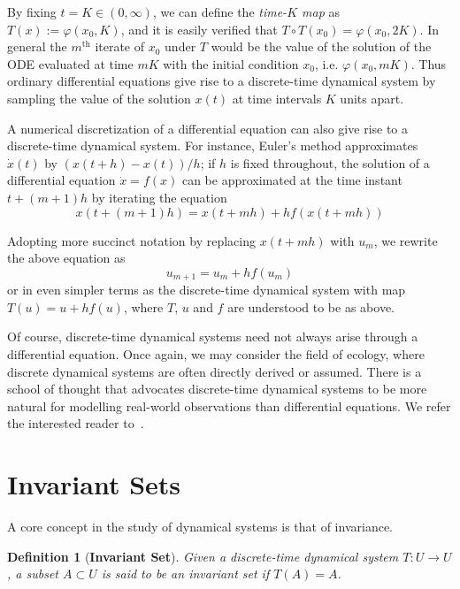 \documentclass[a4paper,12pt,twoside]{report}
\newtheorem{Definition}{Definition}[]
\begin{document}
By fixing $t=K \in (0,\infty)$, we can define the \emph{time-$K$ map} as  $T(x):= \varphi(x_0,K)$, and it is easily verified that $T\circ T(x_0) = \varphi(x_0,2K)$. In general the $m^{\mbox{th}}$ iterate of $x_0$ under $T$ would be the value of the solution of the ODE evaluated at time $mK$ with the initial condition $x_0$, i.e. $\varphi(x_0, mK)$. 
Thus ordinary differential equations give rise to a discrete-time dynamical system by sampling the value of the solution $x(t)$ at time intervals $K$ units apart. 


A numerical discretization of a differential equation can also give rise to a discrete-time dynamical system. For instance, Euler's method approximates $\dot{x}(t)$ by $(x(t+h)-x(t))/h$; if $h$ is fixed throughout, the solution of a differential equation $\dot{x}=f(x)$ 
can be approximated at the time instant $t+(m+1)h$ by iterating the equation 
\begin{equation}
  x(t+(m+1)h) = x(t+mh) + h f(x(t+mh))
\end{equation}

Adopting more succinct notation by replacing $x(t+mh)$ with $u_m$, we rewrite the above equation as
\begin{equation}
u_{m+1} = u_m + hf(u_m)
\end{equation}
or in even simpler terms as the discrete-time dynamical system with map $T(u) = u + hf(u)$, where $T$, $u$ and $f$ are understood to be as above.


Of course, discrete-time dynamical systems need not always arise through a differential equation. Once again, we may consider the field of ecology, where discrete dynamical systems are often directly derived or assumed. 
There is a school of thought that advocates discrete-time dynamical systems to be more natural for modelling real-world observations than differential equations. We refer the interested reader to~\cite{saber2010introduction}.


\section{Invariant Sets}

A core concept in the study of dynamical systems is that of invariance. 
\begin{Definition}
  [\bf Invariant Set]\label{Dfn_InvariantSet}\rm
  Given a discrete-time dynamical system $T: U \to U$, a subset $A \subset U$ is said to be an \emph{invariant set} if $T(A) =A$. 
\end{Definition}
\end{document}
